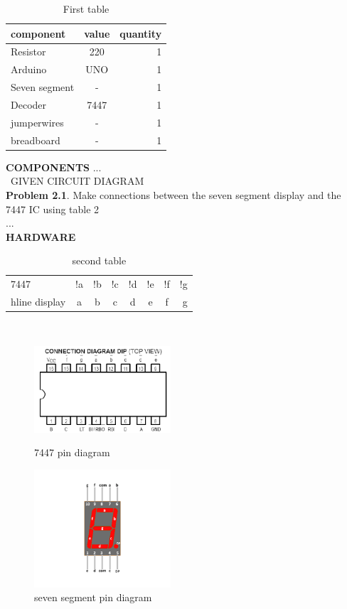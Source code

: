 \documentclass{article}
\begin{document}
 \begin{table}[ht]
            \centering
            \begin{tabular}{|l|c|r|}
            \hline
        component & value & quantity\\
        \hline

Resistor & 220 & 1\\
\hline
Arduino & UNO & 1\\
\hline
Seven segment & - & 1\\
\hline
Decoder & 7447& 1\\
\hline
jumperwires & - & 1\\
\hline
breadboard & - & 1\\
\hline
\end{tabular}
\caption{First table}
\label{tab:first table}
\end{table}
\textbf{COMPONENTS}
...\\\
GIVEN CIRCUIT DIAGRAM \\
\textbf{Problem 2.1}. Make connections between the seven
segment display  and the 7447 IC using table 2\\
...\\
\textbf{HARDWARE}
 \begin{table}[ht]
            \centering
            \begin{tabular}{|l|c|c|c|c|c|c|r|}
            \hline
            7447 & !a & !b & !c & !d & !e & !f & !g
            \\hline
            display & a & b & c & d & e & f & g\\
            \hline
            \end{tabular}
\caption{second table}
\label{tab:second table}
\end{table}\\
\begin{figure}[ht]
\centering
\begin{minipage}[b]{.49\textwidth}
    \includegraphics[width=2in]{7447.png}
    \caption{7447 pin diagram}
    \label{fig:7447 pin diagram}
     \end{minipage}
\begin{minipage}[b]{.49\textwidth}
\includegraphics[width=2in]{seven segment.png}
    \caption{seven segment pin diagram}
    \label{fig:seven segment pin diagram}
     \end{minipage}
\end{figure}
\end{document}

